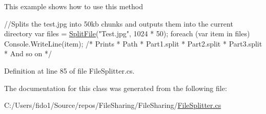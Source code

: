 This example shows how to use this method 
\begin{DoxyCode}
\textcolor{comment}{//Splits the test.jpg into 50kb chunks and outputs them into the current directory}
var files = \hyperlink{class_file_sharing_1_1_file_splitter_a25696a2fad3740fa24f79fd194da6ec3}{SplitFile}(\textcolor{stringliteral}{"Test.jpg"}, 1024 * 50);
\textcolor{keywordflow}{foreach} (var item \textcolor{keywordflow}{in} files)
    Console.WriteLine(item);
\textcolor{comment}{/* Prints}
\textcolor{comment}{ * Path}
\textcolor{comment}{ * Part1.split}
\textcolor{comment}{ * Part2.split}
\textcolor{comment}{ * Part3.split}
\textcolor{comment}{ * And so on}
\textcolor{comment}{ */}
\end{DoxyCode}
 

Definition at line 85 of file File\+Splitter.\+cs.



The documentation for this class was generated from the following file\+:\begin{DoxyCompactItemize}
\item 
C\+:/\+Users/fido1/\+Source/repos/\+File\+Sharing/\+File\+Sharing/\hyperlink{_file_splitter_8cs}{File\+Splitter.\+cs}\end{DoxyCompactItemize}
